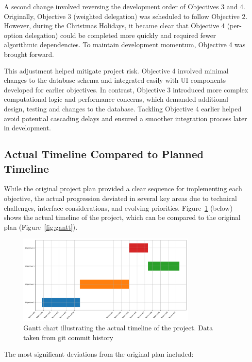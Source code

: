A second change involved reversing the development order of Objectives 3 and 4. Originally, Objective 3 (weighted delegation) was scheduled to follow Objective 2. However, during the Christmas Holidays, it became clear that Objective 4 (per-option delegation) could be completed more quickly and required fewer algorithmic dependencies. To maintain development momentum, Objective 4 was brought forward.

This adjustment helped mitigate project risk. Objective 4 involved minimal changes to the database schema and integrated easily with UI components developed for earlier objectives. In contrast, Objective 3 introduced more complex computational logic and performance concerns, which demanded additional design, testing and changes to the database. Tackling Objective 4 earlier helped avoid potential cascading delays and ensured a smoother integration process later in development.

\subsection{Actual Timeline Compared to Planned Timeline}
While the original project plan provided a clear sequence for implementing each objective, the actual progression deviated in several key areas due to technical challenges, interface considerations, and evolving priorities. Figure~\ref{fig:actual_gantt} (below) shows the actual timeline of the project, which can be compared to the original plan (Figure~\ref{fig:gantt}).
\begin{figure}[H]
    \centering
    \includegraphics[width=0.8\textwidth]{../common/actual_gantt.png}
    \caption{Gantt chart illustrating the actual timeline of the project. Data taken from git commit history}
    \label{fig:actual_gantt}
\end{figure}

The most significant deviations from the original plan included:

